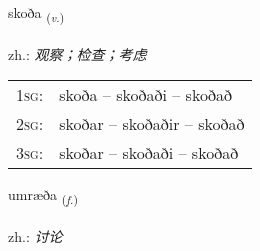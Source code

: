 \documentclass[frontgrid, backgrid]{flacards}\usepackage[]{graphicx}\usepackage[]{xcolor}
\begin{document}
{skoða \small{\textsubscript{(\textit{v.})}} \\[1ex] %
\textphonetic{[skɔːða]} \\
zh.: \emph{观察；检查；考虑} \\  [2ex]
\renewcommand*{\arraystretch}{0.8}
\begin{tabular}{p{1cm}l}
\textsc{1sg}: & skoða -- skoðaði -- skoðað \\ 
\textsc{2sg}: & skoðar -- skoðaðir -- skoðað \\ 
\textsc{3sg}: & skoðar -- skoðaði -- skoðað \\ 
\end{tabular}
}

\renewcommand{\flhead}{\vskip5pt \fboxsep=0pt {\small\bfseries\footnotesize Nafnorð | 名词}}
\renewcommand{\fcfoot}{\vskip5pt \fboxsep=0pt \hspace{2pt}{\small\bfseries\footnotesize 1K}}

\renewcommand{\blhead}{\vskip5pt {\small\bfseries\footnotesize Nafnorð | 名词 }}
\renewcommand{\bcfoot}{\vskip5pt \hspace{2pt}{\small\bfseries\footnotesize 1K}}


{umræða \small{\textsubscript{(\textit{f.})}} \\[1ex] %
\textphonetic{[ʏmraiða]} \\
zh.: \emph{讨论} \\  [2ex]
\renewcommand*{\arraystretch}{0.8}
}

\renewcommand{\flhead}{\vskip5pt \fboxsep=0pt {\small\bfseries\footnotesize Nafnorð | 名词}}
\renewcommand{\fcfoot}{\vskip5pt \fboxsep=0pt \hspace{2pt}{\small\bfseries\footnotesize 1K}}
\end{document}
